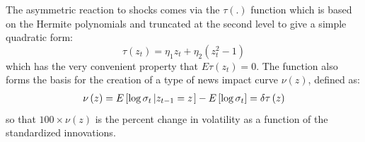 The asymmetric reaction to shocks comes via the $\tau\left(.\right)$ function which is based on the Hermite polynomials and truncated at the second level to give a simple quadratic form:
\begin{equation}
\tau\left(z_t\right) = \eta_1z_t + \eta_2\left(z^2_t-1\right)
\end{equation}
which has the very convenient property that $E\tau\left(z_t\right)=0$. The function also forms the basis for the creation of a type of news impact curve $\nu \left( z \right)$, defined as:
\begin{equation}
\begin{gathered}
  \nu \left( z \right) = E\left[ {\log {\sigma _t}\left| {{z_{t - 1}} = z} \right.} \right] - E\left[ {\log {\sigma _t}} \right] = \delta \tau \left( z \right) \hfill \\
\end{gathered}
\end{equation}
so that $100\times\nu\left(z\right)$ is the percent change in volatility as a function of the standardized innovations.

